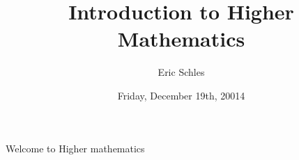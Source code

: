 \documentclass{book}
\title{Introduction to Higher Mathematics}
\author{Eric Schles}
\date{ Friday, December 19th, 20014}
\begin{document}
\maketitle
Welcome to Higher mathematics
\tableofcontents
\end{document}
